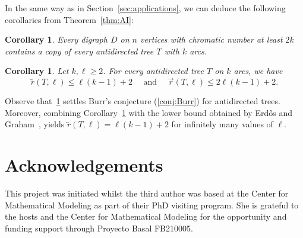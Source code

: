 \documentclass[11pt]{article}
\newtheorem{corollary}[theorem]{Corollary}
\numberwithin{equation}{section}
\renewcommand{\geq}{\geqslant}
\renewcommand{\leq}{\leqslant}
\theoremstyle{definition}
\begin{document}
In the same way as in Section~\ref{sec:applications}, we can deduce the following corollaries from Theorem~\ref{thm:AI}:

\begin{corollary}
   \label{cor:burr_ai}
   Every digraph $D$ on $n$ vertices with chromatic number at least $2k$ contains a copy of every antidirected tree $T$ with $k$ arcs.
\end{corollary}

\begin{corollary}
    \label{cor:ramsey_ai}
       Let $k,\ell\geq 2$. For every antidirected tree $T$ on $k$ arcs, we have 
    \begin{equation*}
        \overleftrightarrow{r}(T,\ell)\leq \ell (k-1) +2\quad \text{ and } \quad \overrightarrow r(T,\ell)\le 2\ell(k -1) +2.
    \end{equation*}
\end{corollary}

Observe that~\cref{cor:burr_ai} settles Burr's conjecture (\cref{conj:Burr}) for antidirected trees.
Moreover, combining Corollary~\ref{cor:ramsey_ai} with the lower bound obtained by 
Erd\H{o}s and Graham~\cite{ErdosGraham1973}, yields $\overleftrightarrow{r}(T,\ell)=\ell (k-1) + 2$ for infinitely many values of $\ell$.

\section*{Acknowledgements}
This project was initiated whilst the third author was based at the Center for Mathematical Modeling as part of their PhD visiting program. She is grateful to the hosts and the Center for Mathematical Modeling for the opportunity and funding support through Proyecto Basal FB210005. 



\end{document}
